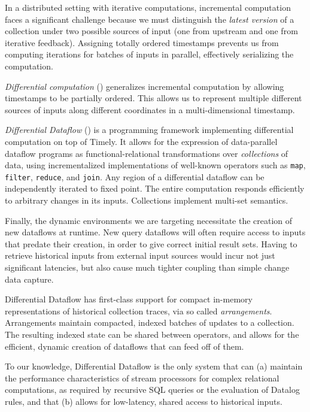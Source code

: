 \documentclass[../index.tex]{subfiles}
\begin{document}
In a distributed setting with iterative computations, incremental
computation faces a significant challenge because we must distinguish
the \emph{latest version} of a collection under two possible sources
of input (one from upstream and one from iterative
feedback). Assigning totally ordered timestamps prevents us from
computing iterations for batches of inputs in parallel, effectively
serializing the computation.

\emph{Differential computation} (\cite{mcsherry2013differential})
generalizes incremental computation by allowing timestamps to be
partially ordered. This allows us to represent multiple different
sources of inputs along different coordinates in a multi-dimensional
timestamp.

\emph{Differential Dataflow} (\cite{differential}) is a programming
framework implementing differential computation on top of Timely. It
allows for the expression of data-parallel dataflow programs as
functional-relational transformations over \emph{collections} of data,
using incrementalized implementations of well-known operators such as
\texttt{map}, \texttt{filter}, \texttt{reduce}, and \texttt{join}. Any
region of a differential dataflow can be independently iterated to
fixed point. The entire computation responds efficiently to arbitrary
changes in its inputs. Collections implement multi-set semantics.

Finally, the dynamic environments we are targeting necessitate the
creation of new dataflows at runtime. New query dataflows will often
require access to inputs that predate their creation, in order to give
correct initial result sets. Having to retrieve historical inputs from
external input sources would incur not just significant latencies, but
also cause much tighter coupling than simple change data capture.

Differential Dataflow has first-class support for compact in-memory
representations of historical collection traces, via so called
\emph{arrangements}. Arrangements maintain compacted, indexed batches
of updates to a collection. The resulting indexed state can be shared
between operators, and allows for the efficient, dynamic creation of
dataflows that can feed off of them.

To our knowledge, Differential Dataflow is the only system that can
(a) maintain the performance characteristics of stream processors for
complex relational computations, as required by recursive SQL queries
or the evaluation of Datalog rules, and that (b) allows for
low-latency, shared access to historical inputs.
\end{document}
